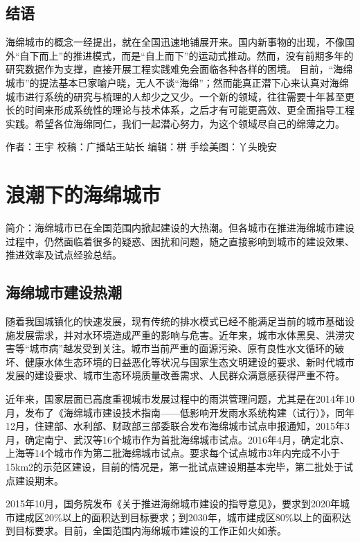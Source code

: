 \documentclass[]{book}
\begin{document}
\subsection{结语}\label{-6}

海绵城市的概念一经提出，就在全国迅速地铺展开来。国内新事物的出现，不像国外``自下而上''的推进模式，而是``自上而下''的运动式推动。然而，没有前期多年的研究数据作为支撑，直接开展工程实践难免会面临各种各样的困境。
目前，``海绵城市''的提法基本已家喻户晓，无人不谈``海绵''；然而能真正潜下心来认真对海绵城市进行系统的研究与梳理的人却少之又少。一个新的领域，往往需要十年甚至更长的时间来形成系统性的理论与技术体系，之后才有可能更高效、更全面指导工程实践。希望各位海绵同仁，我们一起潜心努力，为这个领域尽自己的绵薄之力。

作者：王宇 校稿：广播站王站长 编辑：栟 手绘美图：丫头晚安

\section{浪潮下的海绵城市}

简介：海绵城市已在全国范围内掀起建设的大热潮。但各城市在推进海绵城市建设过程中，仍然面临着很多的疑惑、困扰和问题，随之直接影响到城市的建设效果、推进效率及试点经验总结。

\subsection{海绵城市建设热潮}

随着我国城镇化的快速发展，现有传统的排水模式已经不能满足当前的城市基础设施发展需求，并对水环境造成严重的影响与危害。近年来，城市水体黑臭、洪涝灾害等``城市病''越发受到关注。城市当前严重的面源污染、原有良性水文循环的破坏、健康水体生态环境的日益恶化等状况与国家生态文明建设的要求、新时代城市发展的建设要求、城市生态环境质量改善需求、人民群众满意感获得严重不符。

近年来，国家层面已高度重视城市发展过程中的雨洪管理问题，尤其是在2014年10月，发布了《海绵城市建设技术指南------低影响开发雨水系统构建（试行）》，同年12月，住建部、水利部、财政部三部委联合发布海绵城市试点申报通知，2015年3月，确定南宁、武汉等16个城市作为首批海绵城市试点。2016年4月，确定北京、上海等14个城市作为第二批海绵城市试点。要求每个试点城市3年内完成不小于15km2的示范区建设，目前的情况是，第一批试点建设期基本完毕，第二批处于试点建设期末。

2015年10月，国务院发布《关于推进海绵城市建设的指导意见》，要求到2020年城市建成区20\%以上的面积达到目标要求；到2030年，城市建成区80\%以上的面积达到目标要求。目前，全国范围内海绵城市建设的工作正如火如荼。
\end{document}
